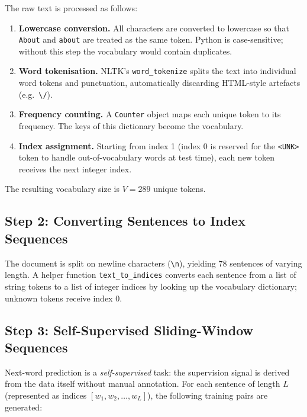 \documentclass[12pt,a4paper]{article}
\begin{document}
The raw text is processed as follows:

\begin{enumerate}[label=\textbf{\arabic*.}]
  \item \textbf{Lowercase conversion.}  All characters are converted to
    lowercase so that \texttt{About} and \texttt{about} are treated as the
    same token.  Python is case-sensitive; without this step the vocabulary
    would contain duplicates.

  \item \textbf{Word tokenisation.}  NLTK's \texttt{word\_tokenize} splits
    the text into individual word tokens and punctuation, automatically
    discarding HTML-style artefacts (e.g.\ \verb|\/|).

  \item \textbf{Frequency counting.}  A \texttt{Counter} object maps each
    unique token to its frequency.  The keys of this dictionary become the
    vocabulary.

  \item \textbf{Index assignment.}  Starting from index 1 (index 0 is
    reserved for the \texttt{<UNK>} token to handle out-of-vocabulary words
    at test time), each new token receives the next integer index.
\end{enumerate}

The resulting vocabulary size is $V = 289$ unique tokens.

\subsection{Step 2: Converting Sentences to Index Sequences}
\label{subsec:index-seq}

The document is split on newline characters (\verb|\n|), yielding 78
sentences of varying length.  A helper function \texttt{text\_to\_indices}
converts each sentence from a list of string tokens to a list of integer
indices by looking up the vocabulary dictionary; unknown tokens receive
index 0.

\subsection{Step 3: Self-Supervised Sliding-Window Sequences}
\label{subsec:sliding-window}

Next-word prediction is a \emph{self-supervised} task: the supervision signal
is derived from the data itself without manual annotation.  For each sentence
of length $L$ (represented as indices $[w_1, w_2, \ldots, w_L]$), the
following training pairs are generated:
\end{document}
